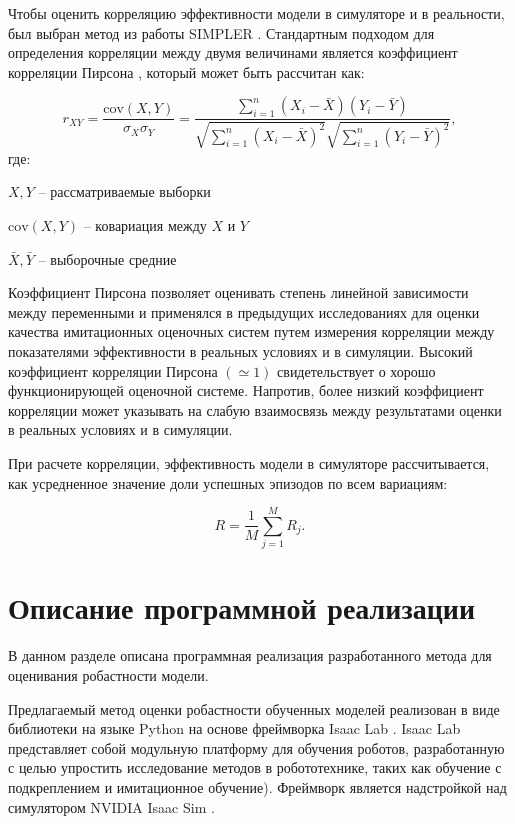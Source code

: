        Чтобы оценить корреляцию эффективности модели в симуляторе и в реальности, был выбран метод из работы SIMPLER \cite{li24simpler}. Стандартным подходом для определения корреляции между двумя величинами является коэффициент корреляции Пирсона \cite{Pearson}, который может быть рассчитан как:

        \begin{equation}
        r_{XY} = \frac{\text{cov}(X, Y)}{\sigma_X \sigma_Y} = \frac{\sum_{i=1}^n (X_i - \bar{X})(Y_i - \bar{Y})}{\sqrt{\sum_{i=1}^n (X_i - \bar{X})^2} \sqrt{\sum_{i=1}^n (Y_i - \bar{Y})^2}},
        \end{equation}
        где:
        \begin{description}
            \item $X, Y$ -- рассматриваемые выборки
            \item $\text{cov}(X, Y)$ -- ковариация между $X$ и $Y$
            \item $\bar{X}, \bar{Y}$ -- выборочные средние
        \end{description}
        
        Коэффициент Пирсона позволяет оценивать степень линейной зависимости между переменными и применялся в предыдущих исследованиях для оценки качества имитационных оценочных систем \cite{Kadian_2020} путем измерения корреляции между показателями эффективности в реальных условиях и в симуляции. Высокий коэффициент корреляции Пирсона $(\simeq 1)$ свидетельствует о хорошо функционирующей оценочной системе.  Напротив, более низкий коэффициент корреляции может указывать на слабую взаимосвязь между результатами оценки в реальных условиях и в симуляции. 

        При расчете корреляции, эффективность модели в симуляторе рассчитывается, как усредненное значение доли успешных эпизодов по всем вариациям:

        \begin{equation}
            R = \frac{1}{M} \sum_{j=1}^M R_j.
        \end{equation}

        \section{Описание программной реализации}

        В данном разделе описана программная реализация разработанного метода для оценивания робастности модели.

        Предлагаемый метод оценки робастности обученных моделей реализован в виде библиотеки на языке Python на основе фреймворка Isaac Lab \cite{isaaclab}. Isaac Lab представляет собой  модульную платформу для обучения роботов, разработанную с целью упростить исследование методов в робототехнике, таких как обучение с подкреплением и имитационное обучение). Фреймворк является надстройкой над симулятором NVIDIA Isaac Sim \cite{nvidia_isaac_sim}. 

